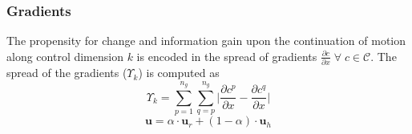 \documentclass[conference]{IEEEtran}
\begin{document}
\subsubsection{Gradients}
The propensity for change and information gain upon the continuation of motion along control dimension $k$ is encoded in the spread of gradients $\frac{\partial c}{\partial x}\; \forall\; c\in \mathcal{C}$. The spread of the gradients ($\Upsilon_{k}$) is computed as  
\begin{equation*}
\Upsilon_{k} = \sum_{p=1}^{n_g}\sum_{q=p}^{n_g}\Big \lvert\frac{\partial c^p}{\partial x} - \frac{\partial c^q}{\partial x}\Big \rvert
\end{equation*}
\begin{equation*}
\boldsymbol{u} = \alpha\cdot \boldsymbol{u}_{r} + (1 - \alpha)\cdot \boldsymbol{u}_h
\end{equation*}
\end{document}
